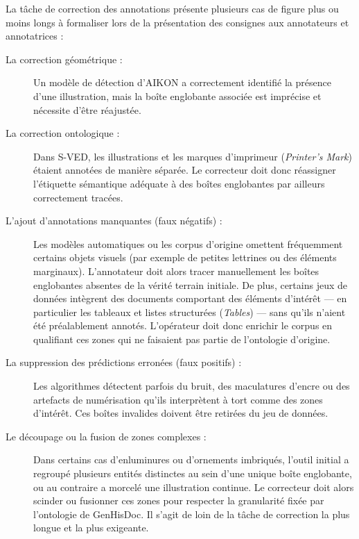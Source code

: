 La tâche de correction des annotations présente plusieurs cas de figure plus ou moins longs à formaliser lors de la présentation des consignes aux annotateurs et annotatrices :

\begin{description}
	\item[La correction géométrique :] Un modèle de détection d'AIKON a correctement identifié la présence d'une illustration, mais la boîte englobante associée est imprécise et nécessite d'être réajustée.
	
	\item[La correction ontologique :] Dans S-VED, les illustrations et les marques d'imprimeur (\textit{Printer's Mark}) étaient annotées de manière séparée. Le correcteur doit donc réassigner l'étiquette sémantique adéquate à des boîtes englobantes par ailleurs correctement tracées.
	
	\item[L'ajout d'annotations manquantes (faux négatifs) :] Les modèles automatiques ou les corpus d'origine omettent fréquemment certains objets visuels (par exemple de petites lettrines ou des éléments marginaux). L'annotateur doit alors tracer manuellement les boîtes englobantes absentes de la vérité terrain initiale. De plus, certains jeux de données intègrent des documents comportant des éléments d'intérêt — en particulier les tableaux et listes structurées (\textit{Tables}) — sans qu'ils n'aient été préalablement annotés. L'opérateur doit donc enrichir le corpus en qualifiant ces zones qui ne faisaient pas partie de l'ontologie d'origine.
	
	\item[La suppression des prédictions erronées (faux positifs) :] Les algorithmes détectent parfois du bruit, des maculatures d'encre ou des artefacts de numérisation qu'ils interprètent à tort comme des zones d'intérêt. Ces boîtes invalides doivent être retirées du jeu de données.
	
	\item[Le découpage ou la fusion de zones complexes :] Dans certains cas d'enluminures ou d'ornements imbriqués, l'outil initial a regroupé plusieurs entités distinctes au sein d'une unique boîte englobante, ou au contraire a morcelé une illustration continue. Le correcteur doit alors scinder ou fusionner ces zones pour respecter la granularité fixée par l'ontologie de GenHisDoc. Il s'agit de loin de la tâche de correction la plus longue et la plus exigeante.
\end{description}

